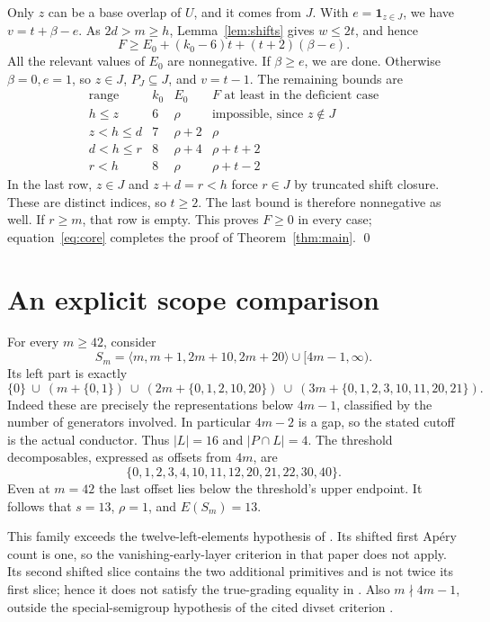 \documentclass[11pt]{article}
\newcommand{\card}[1]{\lvert #1\rvert}
\newcommand{\ind}[1]{\mathbf{1}_{#1}}
\begin{document}
Only $z$ can be a base overlap of $U$, and it comes from $J$.
With $e=\ind{z\in J}$, we have $v=t+\beta-e$.
As $2d>m\geq h$, Lemma~\ref{lem:shifts} gives $w\leq2t$, and hence
\begin{equation}\label{eq:large}
 F\geq E_0+(k_0-6)t+(t+2)(\beta-e).
\end{equation}
All the relevant values of $E_0$ are nonnegative.
If $\beta\geq e$, we are done. Otherwise $\beta=0,e=1$,
so $z\in J$, $P_J\subseteq J$, and $v=t-1$. The remaining bounds are
\[
\begin{array}{c|c|c|c}
\text{range}&k_0&E_0&F\text{ at least in the deficient case}\\ \hline
h\leq z&6&\rho&\text{impossible, since }z\notin J\\
z<h\leq d&7&\rho+2&\rho\\
d<h\leq r&8&\rho+4&\rho+t+2\\
r<h&8&\rho&\rho+t-2
\end{array}
\]
In the last row, $z\in J$ and $z+d=r<h$ force $r\in J$ by truncated
shift closure. These are distinct indices, so $t\geq2$.
The last bound is therefore nonnegative as well. If $r\geq m$, that
row is empty. This proves $F\geq0$ in every case; equation~\eqref{eq:core}
completes the proof of Theorem~\ref{thm:main}. \qed

\section{An explicit scope comparison}\label{sec:scope}

For every $m\geq42$, consider
\[
 S_m=\langle m,m+1,2m+10,2m+20\rangle\cup[4m-1,\infty).
\]
Its left part is exactly
\[
 \{0\}\ \cup\ (m+\{0,1\})\
 \cup\ (2m+\{0,1,2,10,20\})\
 \cup\ (3m+\{0,1,2,3,10,11,20,21\}).
\]
Indeed these are precisely the representations below $4m-1$, classified
by the number of generators involved. In particular $4m-2$ is a gap,
so the stated cutoff is the actual conductor. Thus $\card L=16$ and
$\card{P\cap L}=4$. The threshold decomposables, expressed as offsets
from $4m$, are
\[
 \{0,1,2,3,4,10,11,12,20,21,22,30,40\}.
\]
Even at $m=42$ the last offset lies below the threshold's upper endpoint.
It follows that $s=13$, $\rho=1$, and $E(S_m)=13$.

This family exceeds the twelve-left-elements hypothesis of \cite{twelve}.
Its shifted first Ap\'ery count is one, so the vanishing-early-layer
criterion in that paper does not apply. Its second shifted slice contains
the two additional primitives and is not twice its first slice; hence it
does not satisfy the true-grading equality in \cite{eliahou}.
Also $m\nmid4m-1$, outside the special-semigroup hypothesis of the cited
divset criterion \cite{divsets}.
\end{document}

